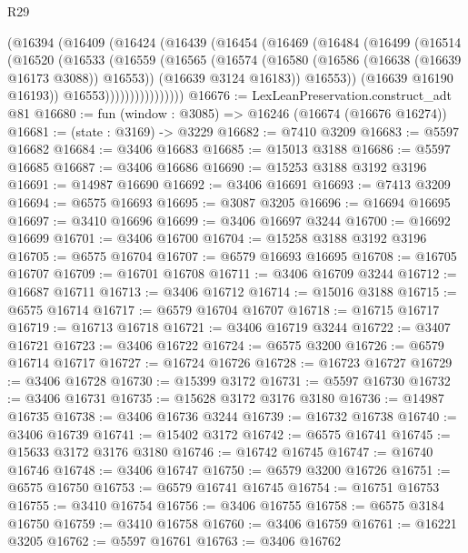 \begin{lexlean}{R29}
\begin{coremodule}
                (@16394
                  (@16409
                    (@16424
                      (@16439
                        (@16454
                          (@16469
                            (@16484
                              (@16499
                                (@16514
                                  (@16520
                                    (@16533
                                      (@16559
                                        (@16565
                                          (@16574
                                            (@16580 (@16586 (@16638 (@16639 @16173 @3088)) @16553))
                                            (@16639 @3124 @16183))
                                          @16553))
                                      (@16639 @16190 @16193))
                                    @16553))))))))))))))))
@16676 := LexLeanPreservation.construct_adt @81
@16680 := fun (window : @3085) => @16246 (@16674 (@16676 @16274))
@16681 := (state : @3169) -> @3229
@16682 := @7410 @3209
@16683 := @5597 @16682
@16684 := @3406 @16683
@16685 := @15013 @3188
@16686 := @5597 @16685
@16687 := @3406 @16686
@16690 := @15253 @3188 @3192 @3196
@16691 := @14987 @16690
@16692 := @3406 @16691
@16693 := @7413 @3209
@16694 := @6575 @16693
@16695 := @3087 @3205
@16696 := @16694 @16695
@16697 := @3410 @16696
@16699 := @3406 @16697 @3244
@16700 := @16692 @16699
@16701 := @3406 @16700
@16704 := @15258 @3188 @3192 @3196
@16705 := @6575 @16704
@16707 := @6579 @16693 @16695
@16708 := @16705 @16707
@16709 := @16701 @16708
@16711 := @3406 @16709 @3244
@16712 := @16687 @16711
@16713 := @3406 @16712
@16714 := @15016 @3188
@16715 := @6575 @16714
@16717 := @6579 @16704 @16707
@16718 := @16715 @16717
@16719 := @16713 @16718
@16721 := @3406 @16719 @3244
@16722 := @3407 @16721
@16723 := @3406 @16722
@16724 := @6575 @3200
@16726 := @6579 @16714 @16717
@16727 := @16724 @16726
@16728 := @16723 @16727
@16729 := @3406 @16728
@16730 := @15399 @3172
@16731 := @5597 @16730
@16732 := @3406 @16731
@16735 := @15628 @3172 @3176 @3180
@16736 := @14987 @16735
@16738 := @3406 @16736 @3244
@16739 := @16732 @16738
@16740 := @3406 @16739
@16741 := @15402 @3172
@16742 := @6575 @16741
@16745 := @15633 @3172 @3176 @3180
@16746 := @16742 @16745
@16747 := @16740 @16746
@16748 := @3406 @16747
@16750 := @6579 @3200 @16726
@16751 := @6575 @16750
@16753 := @6579 @16741 @16745
@16754 := @16751 @16753
@16755 := @3410 @16754
@16756 := @3406 @16755
@16758 := @6575 @3184 @16750
@16759 := @3410 @16758
@16760 := @3406 @16759
@16761 := @16221 @3205
@16762 := @5597 @16761
@16763 := @3406 @16762

\end{coremodule}
\end{lexlean}
